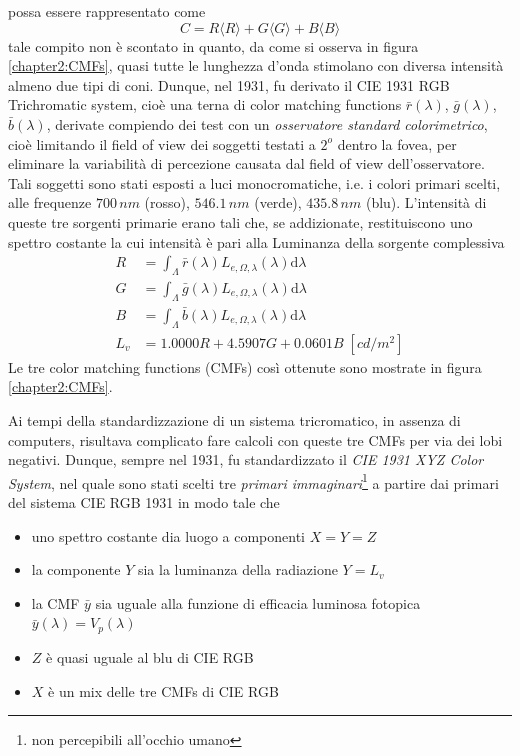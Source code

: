 possa essere rappresentato come
\begin{equation}\label{chapter2:colorimetry:color}
	C = R\langle R\rangle + G\langle G\rangle + B\langle B\rangle
\end{equation}
tale compito non \`e scontato in quanto, da come si osserva in figura \ref{chapter2:CMFs}, 
quasi tutte le lunghezza d'onda 
stimolano con diversa intensit\`a almeno due tipi di coni. Dunque, nel 1931, fu derivato il CIE 1931 RGB Trichromatic system, cio\`e una terna di 
color matching functions $\bar{r}(\lambda)$, $\bar{g}(\lambda)$, $\bar{b}(\lambda)$, derivate compiendo dei test con un 
\textit{osservatore standard colorimetrico}, cio\`e limitando il field of view dei soggetti testati a $2^o$ dentro la fovea, per eliminare la 
variabilit\`a di percezione causata dal field of view dell'osservatore. Tali soggetti sono stati esposti a luci monocromatiche, i.e. i colori primari 
scelti, alle frequenze $700\,\si{nm}$ (rosso), $546.1\,\si{nm}$ (verde), $435.8\,\si{nm}$ (blu). L'intensit\`a di queste tre sorgenti primarie erano
tali che, se addizionate, restituiscono uno spettro costante la cui intensit\`a \`e pari alla Luminanza della sorgente complessiva 
\begin{align}
	R &= \int_\Lambda \bar{r}(\lambda)L_{e,\Omega,\lambda}(\lambda)\mathrm{d}\lambda\\
	G &= \int_\Lambda \bar{g}(\lambda)L_{e,\Omega,\lambda}(\lambda)\mathrm{d}\lambda\\
	B &= \int_\Lambda \bar{b}(\lambda)L_{e,\Omega,\lambda}(\lambda)\mathrm{d}\lambda\\
	L_v &= 1.0000 R + 4.5907 G + 0.0601 B\;[\si{cd/m^2}]
\end{align}
Le tre color matching functions (CMFs) cos\`i 
ottenute sono mostrate in figura \ref{chapter2:CMFs}.\par
Ai tempi della standardizzazione di un sistema tricromatico, in assenza di computers, risultava complicato fare calcoli con queste tre CMFs per via dei
lobi negativi. Dunque, sempre nel 1931, fu standardizzato il \textit{CIE 1931 XYZ Color System}, nel quale sono stati scelti tre 
\textit{primari immaginari}\footnote{non percepibili all'occhio umano} a partire dai primari del sistema CIE RGB 1931 in modo tale che
\begin{itemize}[topsep=0pt, noitemsep]
	\item uno spettro costante dia luogo a componenti $X = Y = Z$
	\item la componente $Y$ sia la luminanza della radiazione $Y = L_v$
	\item la CMF $\bar{y}$ sia uguale alla funzione di efficacia luminosa fotopica $\bar{y}(\lambda) = V_p(\lambda)$
	\item $Z$ \`e quasi uguale al blu di CIE RGB
	\item $X$ \`e un mix delle tre CMFs di CIE RGB
\end{itemize}
